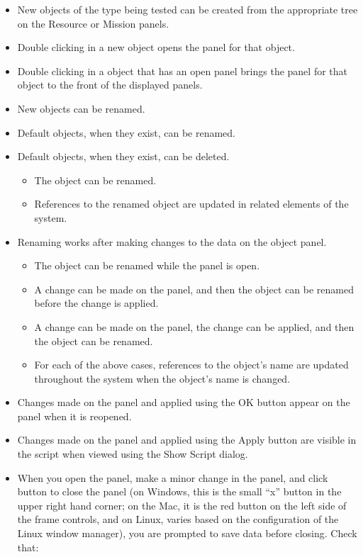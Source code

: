 \begin{itemize}
\item New objects of the type being tested can be created from the appropriate tree on the Resource
or Mission panels.
\item Double clicking in a new object opens the panel for that object.
\item Double clicking in a object that has an open panel brings the panel for that object to the
front of the displayed panels.
\item New objects can be renamed.
\item Default objects, when they exist, can be renamed.
\item Default objects, when they exist, can be deleted.
\begin{itemize}
\item The object can be renamed.
\item References to the renamed object are updated in related elements of the system.
\end{itemize}
\item Renaming works after making changes to the data on the object panel.
\begin{itemize}
\item The object can be renamed while the panel is open.
\item A change can be made on the panel, and then the object can be renamed before the change is
applied.
\item A change can be made on the panel, the change can be applied, and then the object can be
renamed.
\item For each of the above cases, references to the object's name are updated throughout the
system when the object's name is changed.
\end{itemize}
\item Changes made on the panel and applied using the OK button appear on the panel when it is
reopened.
\item Changes made on the panel and applied using the Apply button are visible in the script when
viewed using the Show Script dialog.
\item When you open the panel, make a minor change in the panel, and click button to close the
panel (on Windows, this is the small ``x'' button in the upper right hand corner; on the Mac, it is
the red button on the left side of the frame controls, and on Linux, varies based on the
configuration of the Linux window manager), you are prompted to save data before closing. Check
that:

\end{itemize}
